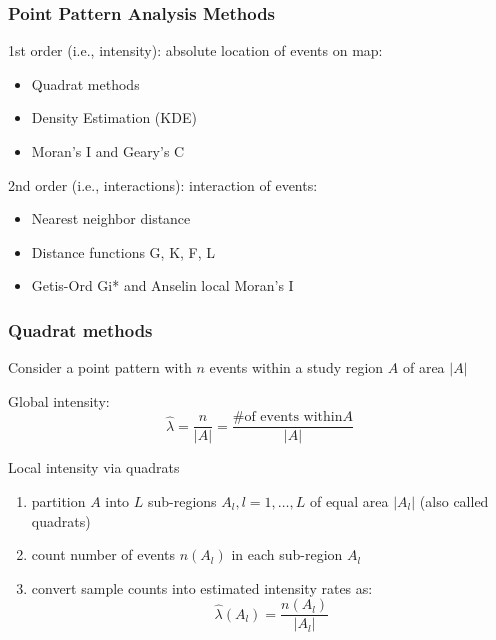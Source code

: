 \documentclass[10pt]{beamer}\usepackage[]{graphicx}\usepackage[]{color}
\newcommand{\bitemize}{\begin{itemize}}
\newcommand{\eitemize}{\end{itemize}}
\newcommand{\benumer}{\begin{enumerate}}
\newcommand{\eenumer}{\end{enumerate}}
\newcommand{\bblock}{\begin{block}}
\newcommand{\eblock}{\end{block}}
\begin{document}
\begin{frame}
\frametitle{Point Pattern Analysis Methods}
\bblock{1st order (i.e., intensity): absolute location of events on map:}
\bitemize
\item Quadrat methods 
\item Density Estimation (KDE)
\item Moran's I and Geary's C
\eitemize
\eblock

\bblock{2nd order (i.e., interactions): interaction of events:}
\bitemize
\item Nearest neighbor distance
\item Distance functions G, K, F, L 
\item Getis-Ord Gi* and Anselin local Moran's I 
\eitemize
\eblock
\end{frame}

\begin{frame}
\frametitle{Quadrat methods}
Consider a point pattern with $n$ events within a study region $A$ of area $|A|$

\bblock{Global intensity:}
\[
\hat{\lambda} = \frac{n}{|A|}=\frac{\# \mbox{of events within} A}{|A|}
\]
\eblock
\bblock{Local intensity via quadrats}
\benumer
\item partition $A$ into $L$ sub-regions ${A_l, l = 1, \ldots, L}$ of equal area $|A_l|$ (also called quadrats)
\item count number of events $n(A_l)$ in each sub-region $A_l$
\item convert sample counts into estimated intensity rates as:
\[
\hat{\lambda}(A_l) = \frac{n(A_l)}{|A_l|}
\]
\eenumer
\eblock
\end{frame}
\end{document}
